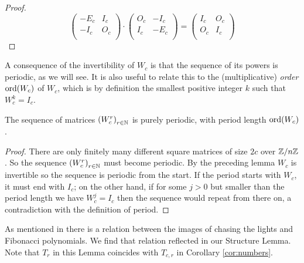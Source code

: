 \begin{proof}
  \[
  \left(
  \begin{array}{cc}
    -E_c & I_c \\
    -I_c & O_c \\
  \end{array}
  \right)
  \cdot
  \left(
  \begin{array}{cc}
    O_c & -I_c  \\
    I_c & -E_c \\
  \end{array}
  \right)
  =
  \left(
  \begin{array}{cc}
    I_c & O_c \\
    O_c & I_c \\
  \end{array}
  \right)
  \]
\end{proof}
%
A consequence of the invertibility of $W_{c}$ is that the sequence of its powers
is periodic, as we will see. It is also useful to relate this to the
(multiplicative) {\it order} $\operatorname{ord}(W_c)$ of $W_c$,
which is by definition the smallest
positive integer $k$ such that $W_c^k=I_c$.

\begin{theorem}\label{thm:Wperiod}
The sequence of matrices $\left(W_{c}^{r}\right)_{r\in\mathbb{N}}$ is purely periodic, with
period length $\operatorname{ord}(W_c)$.
\end{theorem}

\begin{proof}
  There are only finitely many different square matrices of size $2c$ over
  $\mathbb{Z}/n\mathbb{Z}$. So the sequence $\left(W_{c}^{r}\right)_{r\in\mathbb{N}}$ must
  become periodic. By the preceding lemma $W_{c}$ is invertible so the
  sequence is periodic from the start. If the period starts with $W_c$, it
  must end with $I_c$; on the other hand, if for some $j>0$ but smaller than
  the period length we have $W_c^j=I_c$ then the sequence would repeat from
there on, a contradiction with the definition of period.
\end{proof}
%
As mentioned in \cite{leach17} there is a relation between the images of chasing
the lights and Fibonacci polynomials. We find that relation reflected in our
Structure Lemma. Note that $T_r$ in this Lemma coincides with
$T_{c,r}$ in Corollary \ref{cor:numbers}.


